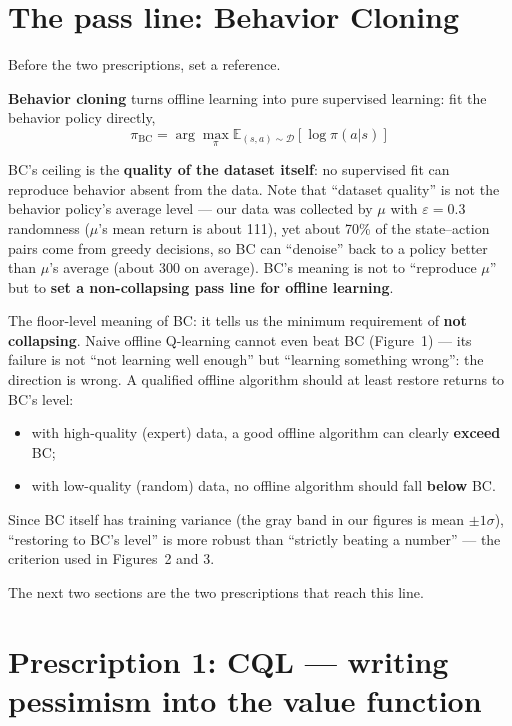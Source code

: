 \documentclass{article}
\begin{document}
\section*{The pass line: Behavior Cloning}

Before the two prescriptions, set a reference.

\textbf{Behavior cloning} turns offline learning into pure supervised learning: fit the behavior policy directly,
\[
\pi_\text{BC} = \arg\max_\pi \mathbb{E}_{(s,a)\sim\mathcal{D}}\!\left[\log\pi(a|s)\right]
\]

BC's ceiling is the \textbf{quality of the dataset itself}: no supervised fit can reproduce behavior absent from the data. Note that ``dataset quality'' is not the behavior policy's average level --- our data was collected by $\mu$ with $\varepsilon=0.3$ randomness ($\mu$'s mean return is about 111), yet about 70\% of the state--action pairs come from greedy decisions, so BC can ``denoise'' back to a policy better than $\mu$'s average (about 300 on average). BC's meaning is not to ``reproduce $\mu$'' but to \textbf{set a non-collapsing pass line for offline learning}.

The floor-level meaning of BC: it tells us the minimum requirement of \textbf{not collapsing}. Naive offline Q-learning cannot even beat BC (Figure~1) --- its failure is not ``not learning well enough'' but ``learning something wrong'': the direction is wrong. A qualified offline algorithm should at least restore returns to BC's level:

\begin{itemize}
  \item with high-quality (expert) data, a good offline algorithm can clearly \textbf{exceed} BC;
  \item with low-quality (random) data, no offline algorithm should fall \textbf{below} BC.
\end{itemize}

Since BC itself has training variance (the gray band in our figures is mean $\pm 1\sigma$), ``restoring to BC's level'' is more robust than ``strictly beating a number'' --- the criterion used in Figures~2 and 3.

The next two sections are the two prescriptions that reach this line.

\section*{Prescription 1: CQL --- writing pessimism into the value function}
\end{document}
